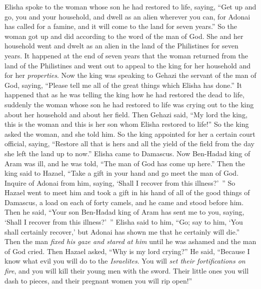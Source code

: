 \begin{biblechapter} %
 Elisha spoke to the woman whose son he had restored to life, saying, “Get up and go, you and your household, and dwell as an alien wherever you can, for Adonai has called for a famine, and it will come to the land for seven years.”
\verse So the woman got up and did according to the word of the man of God. She and her household went and dwelt as an alien in the land of the Philistines for seven years.
\verse It happened at the end of seven years that the woman returned from the land of the Philistines and went out to appeal to the king for her household and for her \textit{properties}.
\verse Now the king was speaking to Gehazi the servant of the man of God, saying, “Please tell me all of the great things which Elisha has done.”
\verse It happened that as he was telling the king how he had restored the dead to life, suddenly the woman whose son he had restored to life was crying out to the king about her household and about her field. Then Gehazi said, “My lord the king, this is the woman and this is her son whom Elisha restored to life!”
\verse So the king asked the woman, and she told him. So the king appointed for her a certain court official, saying, “Restore all that is hers and all the yield of the field from the day she left the land up to now.”
\verse Elisha came to Damascus. Now Ben-Hadad king of Aram was ill, and he was told, “The man of God has come up here.”
\verse Then the king said to Hazael, “Take a gift in your hand and go meet the man of God. Inquire of Adonai from him, saying, ‘Shall I recover from this illness?’ ”
\verse So Hazael went to meet him and took a gift in his hand of all of the good things of Damascus, a load on each of forty camels, and he came and stood before him. Then he said, “Your son Ben-Hadad king of Aram has sent me to you, saying, ‘Shall I recover from this illness?’ ”
\verse Elisha said to him, “Go; say to him, ‘You shall certainly recover,’ but Adonai has shown me that he certainly will die.”
\verse Then the man \textit{fixed his gaze and stared at him} until he was ashamed and the man of God cried.
\verse Then Hazael asked, “Why is my lord crying?” He said, “Because I know what evil you will do to the \textit{Israelites}. You will \textit{set their fortifications on fire}, and you will kill their young men with the sword. Their little ones you will dash to pieces, and their pregnant women you will rip open!”

\end{biblechapter}
